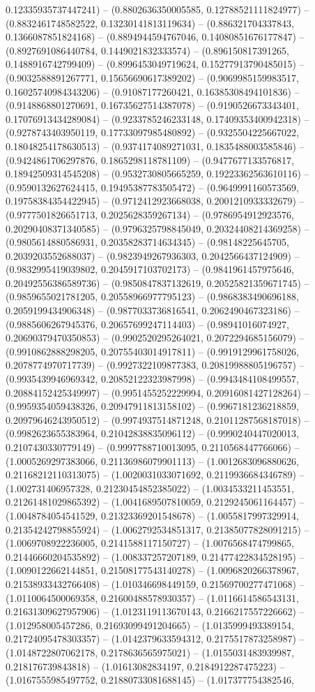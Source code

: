 0.12335935737447241) -- (0.8802636350005585, 0.12788521111824977) -- (0.8832461748582522, 0.13230141813119634) -- (0.886321704337843, 0.1366087851824168) -- (0.8894944594767046, 0.14080851676177847) -- (0.8927691086440784, 0.1449021832333574) -- (0.896150817391265, 0.1488916742799409) -- (0.8996453049719624, 0.15277913790485015) -- (0.9032588891267771, 0.15656690617389202) -- (0.9069985159983517, 0.16025740984343206) -- (0.91087177260421, 0.16385308494101836) -- (0.9148868801270691, 0.16735627514387078) -- (0.9190526673343401, 0.17076913434289084) -- (0.9233785246233148, 0.17409353400942318) -- (0.9278743403950119, 0.17733097985480892) -- (0.9325504225667022, 0.18048254178630513) -- (0.9374174089271031, 0.1835488003585846) -- (0.9424861706297876, 0.1865298118781109) -- (0.9477677133576817, 0.18942509314545208) -- (0.9532730805665259, 0.19223362563610116) -- (0.9590132627624415, 0.19495387783505472) -- (0.9649991160573569, 0.19758384354422945) -- (0.9712412923668038, 0.2001210933332679) -- (0.9777501826651713, 0.2025628359267134) -- (0.9786954912923576, 0.20290408371340585) -- (0.9796325798845049, 0.20324408214369258) -- (0.9805614880586931, 0.20358283714634345) -- (0.98148225645705, 0.2039203552688037) -- (0.9823949267936303, 0.2042566437124909) -- (0.9832995419039802, 0.2045917103702173) -- (0.9841961457975646, 0.20492556386589736) -- (0.9850847837132619, 0.20525821359671745) -- (0.9859655021781205, 0.20558966977795123) -- (0.9868383490696188, 0.2059199434906348) -- (0.9877033736816541, 0.2062490467323186) -- (0.9885606267945376, 0.20657699247114403) -- (0.98941016074927, 0.20690379470350853) -- (0.9902520295264021, 0.2072294685156079) -- (0.9910862888298205, 0.20755403014917811) -- (0.9919129961758026, 0.2078774970717739) -- (0.9927322109877383, 0.20819988805196757) -- (0.9935439946969342, 0.20852122323987998) -- (0.9943484108499557, 0.20884152425349997) -- (0.9951455252229994, 0.20916081427128264) -- (0.9959354059438326, 0.20947911813158102) -- (0.9967181236218859, 0.20979646243950512) -- (0.9974937514871248, 0.21011287568187018) -- (0.9982623655383964, 0.21042838835096112) -- (0.9990240447020013, 0.2107430330779149) -- (0.9997788710013095, 0.2110568447766066) -- (1.0005269297383066, 0.21136986079901113) -- (1.0012683096880626, 0.21168212110313075) -- (1.0020031033071692, 0.2119936684346789) -- (1.002731406957328, 0.21230454852385022) -- (1.0034533211453551, 0.21261481029865392) -- (1.0041689507810059, 0.2129245061164457) -- (1.0048784054541529, 0.21323369201548678) -- (1.0055817997329914, 0.21354242798855924) -- (1.0062792534851317, 0.21385077828091215) -- (1.0069708922236005, 0.2141588117150727) -- (1.0076568474799865, 0.21446660204535892) -- (1.008337257207189, 0.21477422834528195) -- (1.0090122662144851, 0.21508177543140278) -- (1.0096820266378967, 0.21538933432766408) -- (1.010346698449159, 0.21569700277471068) -- (1.0110064500069358, 0.21600488578930357) -- (1.0116614586543131, 0.21631309627957906) -- (1.0123119113670143, 0.2166217557226662) -- (1.012958005457286, 0.21693099491204665) -- (1.0135999493389154, 0.21724095478303357) -- (1.0142379633594312, 0.2175517873258987) -- (1.0148722807062178, 0.2178636565975021) -- (1.0155031483939987, 0.218176739843818) -- (1.01613082834197, 0.2184912287475223) -- (1.0167555985497752, 0.21880733081688145) -- (1.017377754382546, 